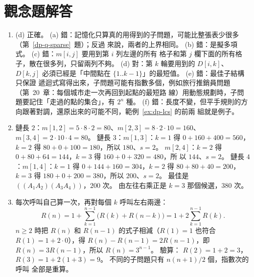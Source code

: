 \section*{觀念題解答}

\begin{enumerate}
\item (d) 正確。
(a) 錯：記憶化只算真的用得到的子問題，可能比整張表少很多（第~\ref{dp-q-sparse}~題）；反過
來說，兩者的上界相同。 (b) 錯：是擬多項式。 (c) 錯：$m[i, j]$ 要用到第 $i$ 列左邊的所有
格子和第 $j$ 欄下面的所有格子，散在很多列，只留兩列不夠。 (d) 對：第 $k$ 輪要用到的
$D[i, k]$、$D[k, j]$ 必須已經是「中間點在 $\{1..k-1\}$」的最短值。 (e) 錯：最佳子結構只保證
遞迴式寫得出來，子問題可能有指數多個，例如旅行推銷員問題（第~20~章：每個城市走一次再回到起點的最短路
線）用動態規劃時，子問題要記住「走過的點的集合」，有 $2^n$ 種。
(f) 錯：長度不變，但平手規則的方向跟著對調，還原出來的可能不同，範例~\ref{ex:dp-lcs} 的前兩
組就是例子。

\item 鏈長 $2$：$m[1,2] = 5 \cdot 8 \cdot 2 = 80$、$m[2,3] = 8 \cdot 2 \cdot 10 = 160$、
$m[3,4] = 2 \cdot 10 \cdot 4 = 80$。
鏈長 $3$：$m[1,3]$：$k = 1$ 得 $0 + 160 + 400 = 560$，$k = 2$ 得 $80 + 0 + 100 = 180$，所以
$180$、$s = 2$。 $m[2,4]$：$k = 2$ 得 $0 + 80 + 64 = 144$，$k = 3$ 得 $160 + 0 + 320 = 480$，所
以 $144$、$s = 2$。
鏈長 $4$：$m[1,4]$：$k = 1$ 得 $0 + 144 + 160 = 304$，$k = 2$ 得 $80 + 80 + 40 = 200$，
$k = 3$ 得 $180 + 0 + 200 = 380$，所以 $200$、$s = 2$。
最佳是 $((A_1 A_2)(A_3 A_4))$，$200$ 次。 由左往右乘正是 $k = 3$ 那個候選，$380$ 次。

\item 每次呼叫自己算一次，再對每個 $k$ 呼叫左右兩邊：
\[
R(n) = 1 + \sum_{k=1}^{n-1} \bigl(R(k) + R(n - k)\bigr) = 1 + 2\sum_{k=1}^{n-1} R(k) .
\]
$n \ge 2$ 時把 $R(n)$ 和 $R(n-1)$ 的式子相減（$R(1) = 1$ 也符合 $R(1) = 1 + 2 \cdot 0$），得
$R(n) - R(n-1) = 2R(n-1)$，即 $R(n) = 3R(n-1)$，所以 $R(n) = 3^{n-1}$。 驗算：
$R(2) = 1 + 2 = 3$，$R(3) = 1 + 2(1 + 3) = 9$。 不同的子問題只有 $n(n+1)/2$ 個，指數次的呼叫
全部是重算。


\end{enumerate}
